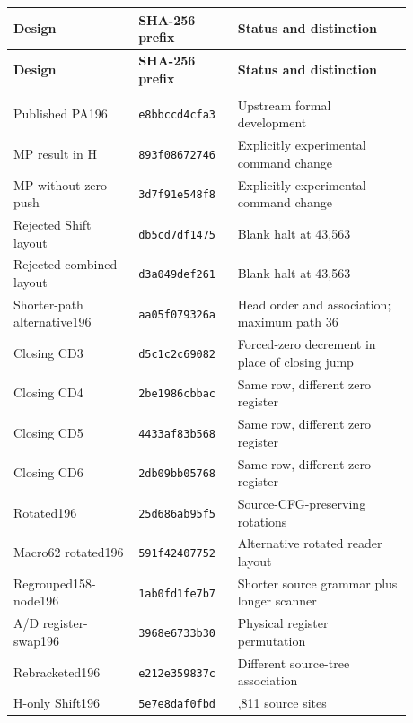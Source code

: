 \begingroup\footnotesize\setlength{\tabcolsep}{3pt}
\renewcommand{\arraystretch}{1.14}
\begin{longtable}{@{}>{\raggedright\arraybackslash}p{0.29\linewidth}>{\raggedright\arraybackslash}p{0.2\linewidth}>{\raggedright\arraybackslash}p{0.39\linewidth}@{}}
\toprule
\textbf{Design} & \textbf{SHA-256 prefix} & \textbf{Status and distinction}\\
\midrule\endfirsthead
\toprule
\textbf{Design} & \textbf{SHA-256 prefix} & \textbf{Status and distinction}\\
\midrule\endhead
\midrule\multicolumn{3}{r}{\emph{Continued on next page}}\\\endfoot
\bottomrule\endlastfoot
Published PA196 & \nolinkurl{e8bbccd4cfa3} & Upstream formal development\\
MP result in H & \nolinkurl{893f08672746} & Explicitly experimental command change\\
MP without zero push & \nolinkurl{3d7f91e548f8} & Explicitly experimental command change\\
Rejected Shift layout & \nolinkurl{db5cd7df1475} & Blank halt at 43,563\\
Rejected combined layout & \nolinkurl{d3a049def261} & Blank halt at 43,563\\
Shorter-path alternative196 & \nolinkurl{aa05f079326a} & Head order and association; maximum path 36\\
Closing CD3 & \nolinkurl{d5c1c2c69082} & Forced-zero decrement in place of closing jump\\
Closing CD4 & \nolinkurl{2be1986cbbac} & Same row, different zero register\\
Closing CD5 & \nolinkurl{4433af83b568} & Same row, different zero register\\
Closing CD6 & \nolinkurl{2db09bb05768} & Same row, different zero register\\
Rotated196 & \nolinkurl{25d686ab95f5} & Source-CFG-preserving rotations\\
Macro62 rotated196 & \nolinkurl{591f42407752} & Alternative rotated reader layout\\
Regrouped158-node196 & \nolinkurl{1ab0fd1fe7b7} & Shorter source grammar plus longer scanner\\
A/D register-swap196 & \nolinkurl{3968e6733b30} & Physical register permutation\\
Rebracketed196 & \nolinkurl{e212e359837c} & Different source-tree association\\
H-only Shift196 & \nolinkurl{5e7e8daf0fbd} & 3,811 source sites\\

\end{longtable}

